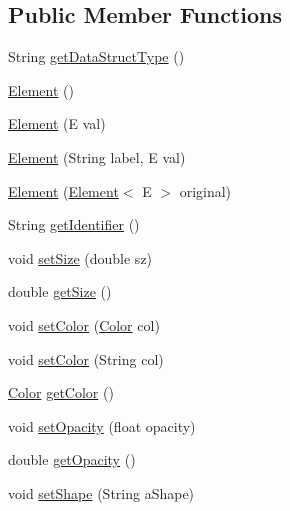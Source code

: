 \subsection*{Public Member Functions}
\begin{DoxyCompactItemize}
\item 
String \mbox{\hyperlink{classbridges_1_1base_1_1_element_a6a1b70fa4b1936d10c6deb433acf8cd9}{get\+Data\+Struct\+Type}} ()
\item 
\mbox{\hyperlink{classbridges_1_1base_1_1_element_aa5fc5728f2ed4b041118a77409442390}{Element}} ()
\item 
\mbox{\hyperlink{classbridges_1_1base_1_1_element_a6cb9b3b85b923602aad5c1be6696d825}{Element}} (E val)
\item 
\mbox{\hyperlink{classbridges_1_1base_1_1_element_a14e857e8050eac518900a458f0364d8e}{Element}} (String label, E val)
\item 
\mbox{\hyperlink{classbridges_1_1base_1_1_element_a91db9de70b65a1d7b5f27c1c0b909832}{Element}} (\mbox{\hyperlink{classbridges_1_1base_1_1_element}{Element}}$<$ E $>$ original)
\item 
String \mbox{\hyperlink{classbridges_1_1base_1_1_element_ad5496f568b4cca3909800eceea5fb47d}{get\+Identifier}} ()
\item 
void \mbox{\hyperlink{classbridges_1_1base_1_1_element_a57153c203d8d2790650edb14ad61c338}{set\+Size}} (double sz)
\item 
double \mbox{\hyperlink{classbridges_1_1base_1_1_element_add4b836e041e45e0c7a80eb7fd5a229d}{get\+Size}} ()
\item 
void \mbox{\hyperlink{classbridges_1_1base_1_1_element_aeb3336746d41a180e50b5efaff2dedc2}{set\+Color}} (\mbox{\hyperlink{classbridges_1_1base_1_1_color}{Color}} col)
\item 
void \mbox{\hyperlink{classbridges_1_1base_1_1_element_a336f2ff70a0873fde6f0b8a43b670ffc}{set\+Color}} (String col)
\item 
\mbox{\hyperlink{classbridges_1_1base_1_1_color}{Color}} \mbox{\hyperlink{classbridges_1_1base_1_1_element_a6b80259f4f23b30df5486bf70f17c3b8}{get\+Color}} ()
\item 
void \mbox{\hyperlink{classbridges_1_1base_1_1_element_a71c622f2cbb03b086c5a8f80d390b366}{set\+Opacity}} (float opacity)
\item 
double \mbox{\hyperlink{classbridges_1_1base_1_1_element_a1427af7efc2d5bc93e00a6a95d268c4d}{get\+Opacity}} ()
\item 
void \mbox{\hyperlink{classbridges_1_1base_1_1_element_ae65bfb47628e028c21c43553ef59b7a2}{set\+Shape}} (String a\+Shape)

\end{DoxyCompactItemize}
